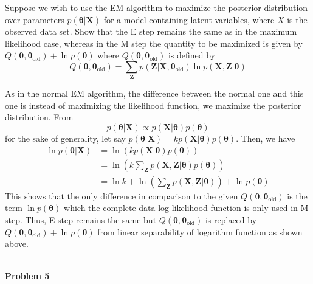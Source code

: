 \documentclass{article}
\begin{document}
Suppose we wish to use the EM algorithm to maximize the posterior distribution over parameters $p(\bm{\theta}|\mathbf{X})$ for a model containing latent variables, where $X$ is the observed data set. 
Show that the E step remains the same as in the maximum likelihood case, whereas in the M step the quantity to be 
maximized is given by $Q(\bm{\theta}, \bm{\theta}_{\text{old}}) + \ln p(\bm{\theta})$ where $Q(\bm{\theta}, \bm{\theta}_{\text{old}})$ is defined by
\begin{equation}
    Q(\bm{\theta}, \bm{\theta}_{\text{old}}) = \sum_\mathbf{Z} p(\mathbf{Z}|\mathbf{X}, \bm{\theta}_{\text{old}}) \ln p(\mathbf{X}, \mathbf{Z}|\bm{\theta})
\end{equation}
\color{blue}
\begin{sol}
As in the normal EM algorithm, the difference between the normal one and this one is instead of maximizing the likelihood function, we maximize the posterior distribution. From
$$p(\bm{\theta}|\mathbf{X}) \propto p(\mathbf{X}|\bm{\theta}) p(\bm{\theta})$$
for the sake of generality, let say $p(\bm{\theta}|\mathbf{X}) = kp(\mathbf{X}|\bm{\theta}) p(\bm{\theta})$. Then, we have
\begin{align*}
    \ln p(\bm{\theta}|\mathbf{X}) &= \ln \left(kp(\mathbf{X}|\bm{\theta})p(\bm{\theta})\right)\\
    &= \ln(k \sum_{\mathbf{Z}} p(\mathbf{X},\mathbf{Z}|\bm{\theta})p(\bm{\theta}))\\
    &= \ln k + \ln \left(\sum_{\mathbf{Z}} p(\mathbf{X},\mathbf{Z}|\bm{\theta})\right) + \ln p(\bm{\theta})
\end{align*}
This shows that the only difference in comparison to the given $Q(\bm{\theta}, \bm{\theta}_{\text{old}})$ is the term $\ln p(\bm{\theta})$ which the complete-data log likelihood function is only used in M step.
Thus, E step remains the same but $Q(\bm{\theta}, \bm{\theta}_{\text{old}})$ is replaced by $Q(\bm{\theta}, \bm{\theta}_{\text{old}}) + \ln p(\bm{\theta})$ from linear separability of logarithm function as shown above.
\end{sol}
\color{black}
\leavevmode\\

\noindent
\Large{\textbf{Problem 5}}\normalsize
\\
\end{document}
